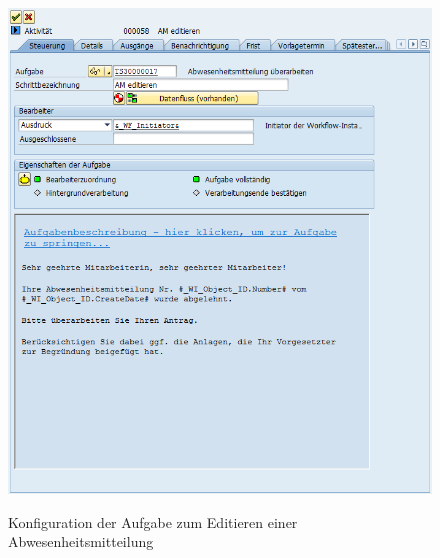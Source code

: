 \begin{figure}[H]
	\begin{center}
	\includegraphics[width=1.0\textwidth]{grafiken/wf-builder_bsp2_act_am-editieren.png}
	\caption{Konfiguration der Aufgabe zum Editieren einer Abwesenheitsmitteilung}
	\vspace{-10pt}
	\label{abb:workflow-bsp2-act_am-editieren}
	\end{center}
\end{figure}

